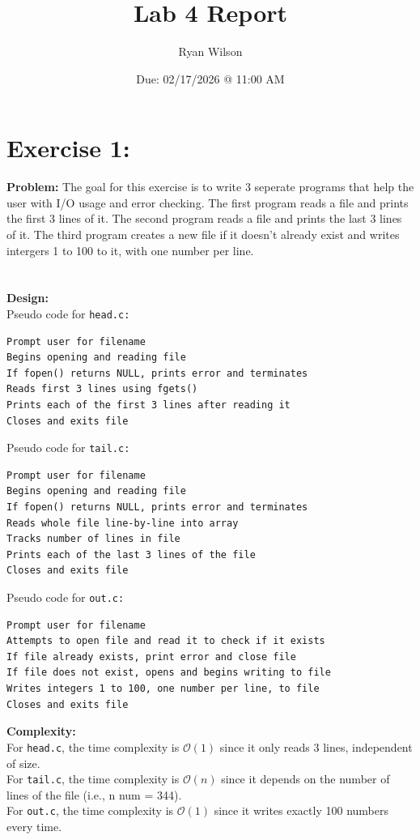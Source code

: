 \documentclass{article}
\title{Lab 4 Report}
\date{Due: 02/17/2026 @ 11:00 AM}
\author{Ryan Wilson}
\begin{document}
\maketitle
\newpage


\section{Exercise 1:}
\textbf{Problem:} The goal for this exercise is to write 3 seperate programs that help the user with I/O usage and error checking.
The first program reads a file and prints the first 3 lines of it. The second program reads a file and prints the last 3 lines of it. The
third program creates a new file if it doesn't already exist and writes intergers 1 to 100 to it, with one number per line.\\\\\\
\textbf{Design:}\\
Pseudo code for \texttt{head.c:}
\begin{verbatim}
Prompt user for filename
Begins opening and reading file
If fopen() returns NULL, prints error and terminates
Reads first 3 lines using fgets()
Prints each of the first 3 lines after reading it
Closes and exits file
\end{verbatim}
\bigskip
Pseudo code for \texttt{tail.c:}
\begin{verbatim}
Prompt user for filename
Begins opening and reading file
If fopen() returns NULL, prints error and terminates
Reads whole file line-by-line into array
Tracks number of lines in file
Prints each of the last 3 lines of the file
Closes and exits file
\end{verbatim}
\bigskip
Pseudo code for \texttt{out.c:}
\begin{verbatim}
Prompt user for filename
Attempts to open file and read it to check if it exists
If file already exists, print error and close file
If file does not exist, opens and begins writing to file
Writes integers 1 to 100, one number per line, to file
Closes and exits file
\end{verbatim}
\bigskip
\bigskip
\textbf{Complexity:}\\
For \texttt{head.c}, the time complexity is $\mathcal{O}(1)$ since it only reads 3 lines, independent of size.\\
For \texttt{tail.c}, the time complexity is $\mathcal{O}(n)$ since it depends on the number of lines of the file (i.e., n num = 344).\\
For \texttt{out.c}, the time complexity is $\mathcal{O}(1)$ since it writes exactly 100 numbers every time.
\newpage
\end{document}
